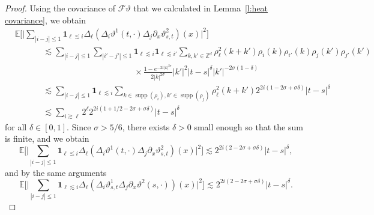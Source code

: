 \documentclass[a4paper,11pt]{article}
\newcommand{\tmop}[1]{\ensuremath{\operatorname{#1}}}
\theoremstyle{remark}
\newcommand{\E}{\mathbb{E}}
\newcommand{\CF}{\ensuremath{\mathscr{F}}}
\begin{document}
\begin{proof}
   Using the covariance of $\CF \vartheta$ that we calculated in Lemma~\ref{l:heat covariance}, we obtain
   \begin{align*}
      &\E\biggl[\biggl|\sum_{|i-j| \leqslant 1} \mathbf{1}_{\ell \lesssim i} \Delta_{\ell} ( \Delta_i \vartheta^1(t,\cdot) \Delta_j \partial_x \vartheta^2_{s,t})(x)\biggr|^2\biggr] \\
      &\hspace{40pt} \lesssim \sum_{| i - j | \leqslant 1} \sum_{| i' - j' | \leqslant 1} \mathbf{1}_{\ell \lesssim i} \mathbf{1}_{\ell \lesssim i'} \sum_{k, k' \in \mathbb{Z}^d} \rho_{\ell}^2 (k+k') \rho_i ( k ) \rho_{i'} ( k ) \rho_j (k') \rho_{j'}(k')\\
      &\hspace{170pt} \times \frac{1 - e^{-2t|k|^{2\sigma}}}{2 |k|^{2 \sigma}} |k'|^2 |t-s|^{\delta} |k'|^{-2\sigma(1 - \delta)}\\
      &\hspace{40pt} \lesssim \sum_{| i - j | \leqslant 1} \mathbf{1}_{\ell \lesssim i} \sum_{k \in \tmop{supp} ( \rho_i ), k' \in \tmop{supp} ( \rho_j )} \rho_{\ell}^2 ( k + k' ) 2^{2i(1 - 2\sigma + \sigma \delta)} |t-s|^{\delta} \\
      &\hspace{40pt} \lesssim \sum_{i \gtrsim \ell} 2^\ell 2^{2i(1 + 1/2 - 2\sigma + \sigma\delta)} |t-s|^{\delta} 
   \end{align*}
   for all $\delta \in [0,1]$. Since $\sigma > 5/6$, there exists $\delta >0$ small enough so that the sum is finite, and we obtain
   \[
      \E\biggl[\biggl|\sum_{|i-j| \leqslant 1} \mathbf{1}_{\ell \lesssim i} \Delta_{\ell} ( \Delta_i \vartheta^1(t,\cdot) \Delta_j \partial_x \vartheta^2_{s,t})(x)\biggr|^2\biggr]  \lesssim 2^{2i(2 - 2\sigma + \sigma \delta)}  |t-s|^{\delta},
   \]
   and by the same arguments
   \[
      \E\biggl[\biggl|\sum_{|i-j| \leqslant 1} \mathbf{1}_{\ell \lesssim i} \Delta_{\ell} ( \Delta_i \vartheta^1_{s,t} \Delta_j \partial_x \vartheta^2(s,\cdot))(x)\biggr|^2\biggr]  \lesssim 2^{2i(2 - 2\sigma + \sigma \delta)}  |t-s|^{\delta}.
   \]   
%   
%   

\end{proof}
\end{document}
